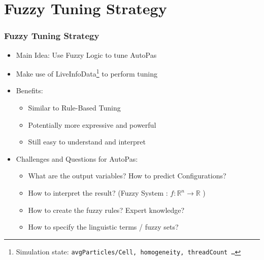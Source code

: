 \documentclass[
	10pt,
	t		%
]{beamer}
\begin{document}
\section{Fuzzy Tuning Strategy}
\begin{frame}
	\frametitle{Fuzzy Tuning Strategy}

	\begin{itemize}
		\item Main Idea: Use Fuzzy Logic to tune AutoPas
		\item Make use of LiveInfoData\footnote{Simulation state: \texttt{avgParticles/Cell, homogeneity, threadCount \dots }} to perform tuning
		\item Benefits:
		      \begin{itemize}
			      \item Similar to Rule-Based Tuning
			      \item Potentially more expressive and powerful
			      \item Still easy to understand and interpret
		      \end{itemize}
		\item Challenges and Questions for AutoPas:
		      \begin{itemize}
			      \item What are the output variables? How to predict Configurations?
			      \item How to interpret the result? (Fuzzy System : $f :\mathbb{R}^n \rightarrow \mathbb{R}$ )
			      \item How to create the fuzzy rules? Expert knowledge?
			      \item How to specify the linguistic terms / fuzzy sets?
		      \end{itemize}
	\end{itemize}
\end{frame}
\end{document}

